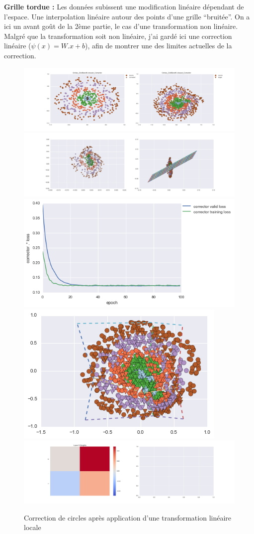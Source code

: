 {\Large \textbf{Grille tordue :}} Les données subissent une modification linéaire dépendant de l'espace.
Une interpolation linéaire autour des points d'une grille ``bruitée''.
On a ici un avant goût de la 2ème partie, le cas d'une transformation non linéaire.
Malgré que la transformation soit non linéaire, j'ai gardé ici une correction linéaire ($\psi(x) = W.x+b$),
afin de montrer une des limites actuelles de la correction.

\begin{figure}[H] %
\centering
\includegraphics[width=\linewidth]{fig/24-05-2016/circles/Circles_GridBendK-closest_Corrector-DATA.png}
\includegraphics[width=\linewidth]{fig/24-05-2016/circles/Circles_GridBendK-closest_Corrector-GridCheck.png}
\includegraphics[width=0.45\linewidth]{fig/24-05-2016/circles/Circles_GridBendK-closest_Corrector-Learning_curve.png}
\includegraphics[width=0.45\linewidth]{fig/24-05-2016/circles/circles_grid.png}
\includegraphics[width=\linewidth]{fig/24-05-2016/circles/Circles_GridBendK-closest_Corrector-W.png}
\caption{Correction de circles après application d'une transformation linéaire locale}
\label{fig:recap-circles-GridBend-exhaustive}
\end{figure}


